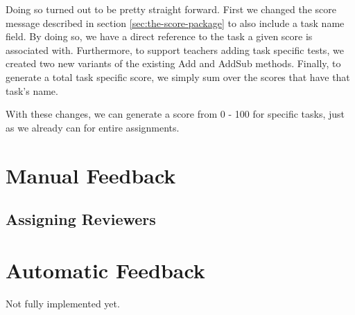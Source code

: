 Doing so turned out to be pretty straight forward.
First we changed the score message described in section \ref{sec:the-score-package} to also include a task name field.
By doing so, we have a direct reference to the task a given score is associated with.
Furthermore, to support teachers adding task specific tests, we created two new variants of the existing Add and AddSub methods.
Finally, to generate a total task specific score, we simply sum over the scores that have that task's name.

With these changes, we can generate a score from 0 - 100 for specific tasks, just as we already can for entire assignments.

\section{Manual Feedback}

\subsection{Assigning Reviewers}

\section{Automatic Feedback}

Not fully implemented yet.